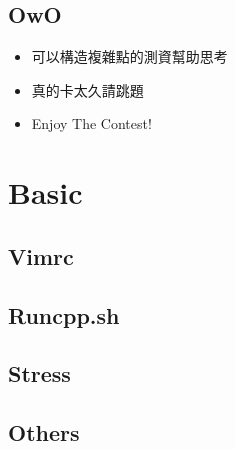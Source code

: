 \documentclass[a4paper,10pt,twocolumn,oneside,x11names]{article}
\begin{document}
\subsection{OwO}
\begin{itemize}[nolistsep]
\item 可以構造複雜點的測資幫助思考
\item 真的卡太久請跳題
\item Enjoy The Contest!
\end{itemize}


\section{Basic}

% 

\subsection{Vimrc}


\subsection{Runcpp.sh}


\subsection{Stress}


\subsection{Others}


%
\end{document}
